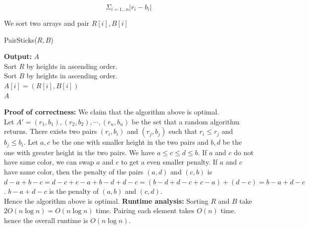 \documentclass[11pt]{article}
\begin{document}
\begin{enumerate}
$$\Sigma_{i=1\ldots n} |r_i - b_i|$$

We sort two arrays and pair $R[i], B[i]$

\begin{algorithm} [h]
    \caption{PairSticks($R, B$)} {
        \textbf{Output:} $A$\\
        Sort $R$ by heights in ascending order.\\
        Sort $B$ by heights in ascending order.\\
         {
            $A[i] = (R[i], B[i])$\\
        }
        \Return $A$
    }
\end{algorithm}

\textbf{Proof of correctness:} We claim that the algorithm above is optimal.\\
Let $A' = {(r_1, b_1), (r_2, b_2), \cdots, (r_n, b_n)}$ be the 
set that a random algorithm returns. There exists two pairs $(r_i, b_i)$ and $(r_j, b_j)$ such that $r_i \leq r_j$ 
and $b_j \leq b_i$. Let $a, c$ be the one with smaller height in the two pairs and $b, d$  be the one with greater 
height in the two pairs. We have $a \leq c \leq d \leq b$. If $a$ and $c$ do not have same color, we can swap 
$a$ and $c$ to get a even smaller penalty. If $a$ and $c$ have same color, then the penalty of the pairs $(a, d)$ 
and $(c, b)$ is $d - a + b - c = d - c + c - a + b - d + d - c = (b - d + d - c + c - a) + (d - c) = b - a + d - c$. 
$b - a + d - c$ is the penalty of $(a, b)$ and $(c, d)$.\\
Hence the algorithm above is optimal.
\textbf{Runtime analysis:} Sorting $R$ and $B$ take $2O(n \log n) = O(n \log n)$ time. Pairing each element takes 
$O(n)$ time. hence the overall runtime is $O(n \log n)$. 

\end{enumerate}
\end{document}

